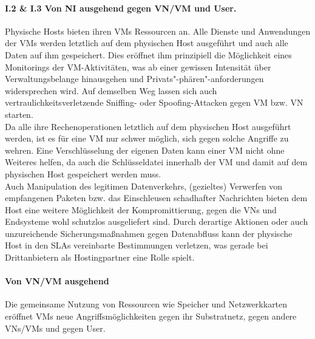 \paragraph{I.2 \& I.3 Von NI ausgehend gegen VN/VM und User.}
\label{parag:vonNI}
Physische Hosts bieten ihren VMs Ressourcen an. Alle Dienste und Anwendungen der VMs werden letztlich auf dem physischen Host ausgeführt und auch alle Daten auf ihm gespeichert. Dies eröffnet ihm prinzipiell die Möglichkeit eines Monitorings der VM-Aktivitäten, was ab einer gewissen Intensität über Verwaltungsbelange hinausgehen und Privats"-phären"-anforderungen widersprechen wird. Auf demselben Weg lassen sich auch vertraulichkeitsverletzende Sniffing- oder Spoofing-Attacken gegen VM bzw. VN starten. \\
Da alle ihre Rechenoperationen letztlich auf dem physischen Host ausgeführt werden, ist es für eine VM nur schwer möglich, sich gegen solche Angriffe zu wehren. Eine Verschlüsselung der eigenen Daten kann einer VM nicht ohne Weiteres helfen, da auch die Schlüsseldatei innerhalb der VM und damit auf dem physischen Host gespeichert werden muss.\\
Auch Manipulation des legitimen Datenverkehrs, (gezieltes) Verwerfen von empfangenen Paketen bzw. das Einschleusen schadhafter Nachrichten bieten dem Host eine weitere Möglichkeit der Kompromittierung, gegen die VNs und Endsysteme wohl schutzlos ausgeliefert sind.
Durch derartige Aktionen oder auch unzureichende Sicherungsmaßnahmen gegen Datenabfluss kann der physische Host in den SLAs vereinbarte Bestimmungen verletzen, was gerade bei Drittanbietern als Hostingpartner eine Rolle spielt.




\paragraph{Von VN/VM ausgehend}
\label{parag:vonVN}
Die gemeinsame Nutzung von Ressourcen wie Speicher und Netzwerkkarten eröffnet VMs neue Angriffsmöglichkeiten gegen ihr Substratnetz, gegen andere VNs/VMs und gegen User.


